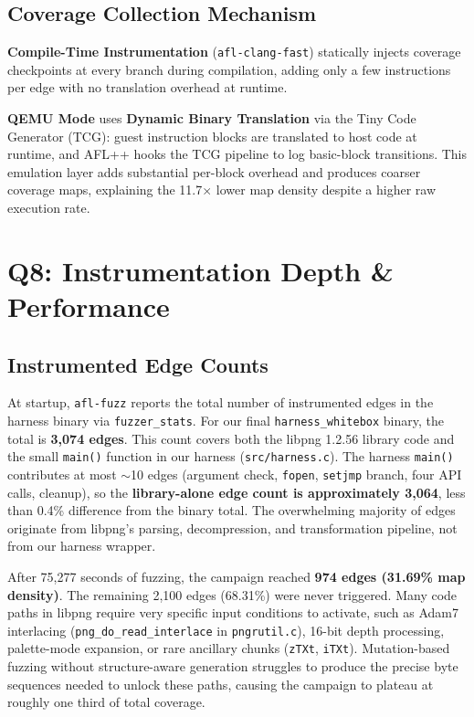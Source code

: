 \documentclass[letterpaper,twocolumn,10pt]{article}
\begin{document}
\subsection{Coverage Collection Mechanism}
\textbf{Compile-Time Instrumentation} (\texttt{afl-clang-fast}) statically injects
coverage checkpoints at every branch during compilation, adding only a few
instructions per edge with no translation overhead at runtime.

\textbf{QEMU Mode} uses \textbf{Dynamic Binary Translation} via the Tiny Code
Generator (TCG): guest instruction blocks are translated to host code at runtime,
and AFL++ hooks the TCG pipeline to log basic-block transitions. This emulation
layer adds substantial per-block overhead and produces coarser coverage maps,
explaining the 11.7$\times$ lower map density despite a higher raw execution rate.

\section{Q8: Instrumentation Depth \& Performance}

\subsection{Instrumented Edge Counts}
At startup, \texttt{afl-fuzz} reports the total number of instrumented edges in
the harness binary via \texttt{fuzzer\_stats}. For our final \texttt{harness\_whitebox}
binary, the total is \textbf{3,074 edges}. This count covers both the libpng
1.2.56 library code and the small \texttt{main()} function in our harness
(\texttt{src/harness.c}). The harness \texttt{main()} contributes at most
$\sim$10 edges (argument check, \texttt{fopen}, \texttt{setjmp} branch, four
API calls, cleanup), so the \textbf{library-alone edge count is approximately
3,064}, less than 0.4\% difference from the binary total. The overwhelming
majority of edges originate from libpng's parsing, decompression, and
transformation pipeline, not from our harness wrapper.

After 75,277 seconds of fuzzing, the campaign reached \textbf{974 edges
(31.69\% map density)}. The remaining 2,100 edges (68.31\%) were never
triggered. Many code paths in libpng require very specific input conditions to
activate, such as Adam7 interlacing (\texttt{png\_do\_read\_interlace} in
\texttt{pngrutil.c}), 16-bit depth processing, palette-mode expansion, or rare
ancillary chunks (\texttt{zTXt}, \texttt{iTXt}). Mutation-based fuzzing without
structure-aware generation struggles to produce the precise byte sequences needed
to unlock these paths, causing the campaign to plateau at roughly one third of
total coverage.
\end{document}

